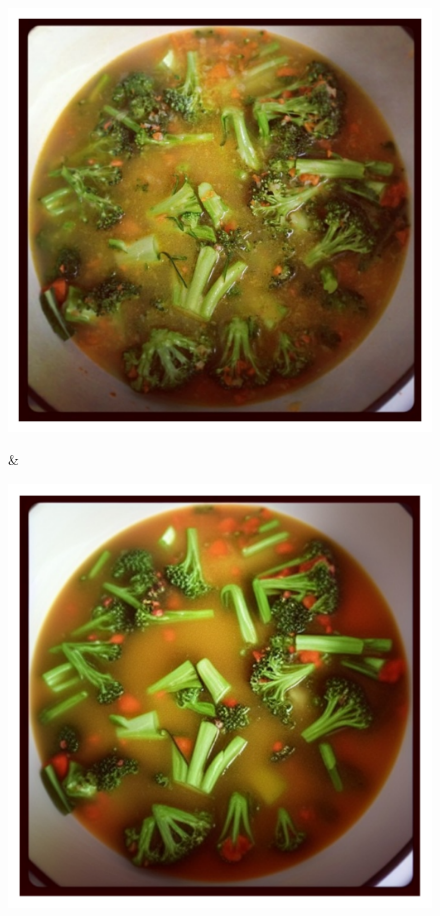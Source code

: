 \documentclass[letterpaper]{article} %
\begin{document}
\begin{figure}
\begin{tabular}
\begin{minipage}{\linewidth}
    \end{minipage}
    \\
    \begin{minipage}{\linewidth}
        \includegraphics[width=\linewidth]{original_compare/58.pdf}
    \end{minipage} &
    \begin{minipage}{\linewidth}
        \includegraphics[width=\linewidth]{Ours_compare/58.pdf}

\end{minipage}
\end{tabular}
\end{figure}
\end{document}
